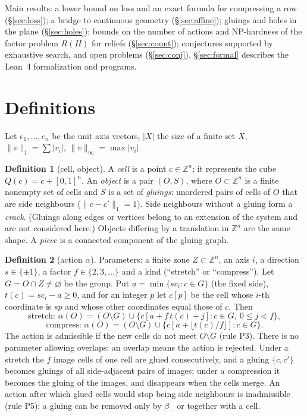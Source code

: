 \documentclass[11pt,a4paper]{article}
\theoremstyle{plain}
\theoremstyle{definition}
\newtheorem{definition}{Definition}
\theoremstyle{remark}
\newcommand{\Z}{\mathbb{Z}}
\begin{document}
Main results: a lower bound on loss and an exact formula for compressing a row (§\ref{sec:loss}); a bridge to continuous geometry (§\ref{sec:affine}); gluings and holes in the plane (§\ref{sec:holes}); bounds on the number of actions and NP-hardness of the factor problem $R(H)$ for reliefs (§\ref{sec:count}); conjectures supported by exhaustive search, and open problems (§\ref{sec:conj}). §\ref{sec:formal} describes the Lean~4 formalization and programs.

\section{Definitions}\label{sec:def}

Let $e_1,\dots,e_n$ be the unit axis vectors, $|X|$ the size of a finite set $X$, $\|v\|_1=\sum|v_i|$, $\|v\|_\infty=\max|v_i|$.

\begin{definition}[cell, object]
A \emph{cell} is a point $c\in\Z^n$; it represents the cube $Q(c)=c+[0,1]^n$. An \emph{object} is a pair $(O,S)$, where $O\subset\Z^n$ is a finite nonempty set of cells and $S$ is a set of \emph{gluings}: unordered pairs of cells of $O$ that are side neighbours ($\|c-c'\|_1=1$). Side neighbours without a gluing form a \emph{crack}. (Gluings along edges or vertices belong to an extension of the system and are not considered here.) Objects differing by a translation in $\Z^n$ are the same shape. A \emph{piece} is a connected component of the gluing graph.
\end{definition}

\begin{definition}[action $\alpha$]
Parameters: a finite zone $Z\subset\Z^n$, an axis $i$, a direction $s\in\{\pm1\}$, a factor $f\in\{2,3,\dots\}$ and a kind (``stretch'' or ``compress''). Let $G=O\cap Z\neq\varnothing$ be the group. Put $a=\min\{s c_i: c\in G\}$ (the fixed side), $t(c)=s c_i-a\ge0$, and for an integer $p$ let $c[p]$ be the cell whose $i$-th coordinate is $sp$ and whose other coordinates equal those of $c$. Then
\[
\text{stretch: } \alpha(O)=(O\setminus G)\cup\{c[a+f\,t(c)+j]: c\in G,\ 0\le j<f\},
\]
\[
\text{compress: } \alpha(O)=(O\setminus G)\cup\{c[a+\lfloor t(c)/f\rfloor]: c\in G\}.
\]
The action is admissible if the new cells do not meet $O\setminus G$ (rule P3). There is no parameter allowing overlaps: an overlap means the action is rejected. Under a stretch the $f$ image cells of one cell are glued consecutively, and a gluing $\{c,c'\}$ becomes gluings of all side-adjacent pairs of images; under a compression it becomes the gluing of the images, and disappears when the cells merge. An action after which glued cells would stop being side neighbours is inadmissible (rule P5): a gluing can be removed only by $\beta_-$ or together with a cell.
\end{definition}
\end{document}
